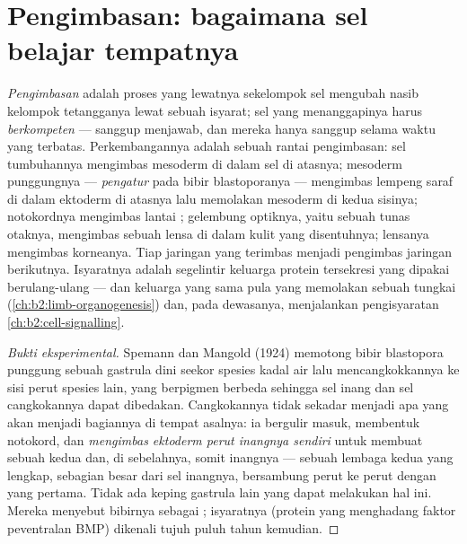 \section{Pengimbasan: bagaimana sel belajar tempatnya}

\begin{definition}\label{def:b2:vertebrate-development:induction}
\emph{Pengimbasan} adalah proses yang lewatnya sekelompok sel mengubah
nasib kelompok tetangganya lewat sebuah isyarat; sel yang menanggapinya
harus \emph{berkompeten} --- sanggup menjawab, dan mereka hanya sanggup
selama waktu yang terbatas. Perkembangannya adalah sebuah rantai
pengimbasan: sel tumbuhannya mengimbas mesoderm di dalam sel di
atasnya; mesoderm punggungnya --- \emph{pengatur} pada bibir
blastoporanya --- mengimbas lempeng saraf di dalam ektoderm di atasnya
lalu memolakan mesoderm di kedua sisinya; notokordnya mengimbas lantai
; gelembung optiknya, yaitu sebuah tunas otaknya,
mengimbas sebuah lensa di dalam kulit yang disentuhnya; lensanya
mengimbas korneanya. Tiap jaringan yang terimbas menjadi pengimbas
jaringan berikutnya. Isyaratnya adalah segelintir keluarga protein
tersekresi yang dipakai berulang-ulang --- dan keluarga yang sama pula
yang memolakan sebuah tungkai (\cref{ch:b2:limb-organogenesis}) dan,
pada dewasanya, menjalankan pengisyaratan
\cref{ch:b2:cell-signalling}.
\end{definition}
\begin{proof}[Bukti eksperimental]
Spemann dan Mangold (1924) memotong bibir blastopora punggung sebuah
gastrula dini seekor spesies kadal air lalu mencangkokkannya ke sisi
perut spesies lain, yang berpigmen berbeda sehingga sel inang dan sel
cangkokannya dapat dibedakan. Cangkokannya tidak sekadar menjadi apa
yang akan menjadi bagiannya di tempat asalnya: ia bergulir masuk,
membentuk notokord, dan \emph{mengimbas ektoderm perut inangnya
sendiri} untuk membuat sebuah  kedua dan, di sebelahnya,
somit inangnya --- sebuah lembaga kedua yang lengkap, sebagian besar
dari sel inangnya, bersambung perut ke perut dengan yang pertama. Tidak
ada keping gastrula lain yang dapat melakukan hal ini. Mereka menyebut
bibirnya sebagai ; isyaratnya (protein yang menghadang faktor
peventralan BMP) dikenali tujuh puluh tahun kemudian.
\end{proof}

